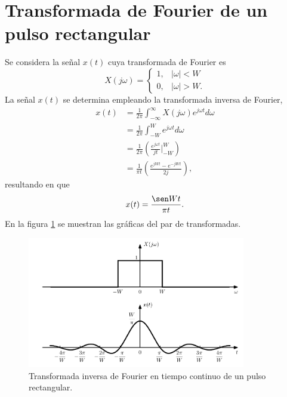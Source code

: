 \documentclass[a4paper]{report}
\begin{document}
\section{Transformada de Fourier de un pulso rectangular}
 
Se considera la señal \(x(t)\) cuya transformada de Fourier es
\[
 X(j\omega)=
 \left\{ 
 \begin{array}{ll}
  1, & |\omega|< W\\
  0, & |\omega|>W.
 \end{array} 
 \right.
\]
La señal \(x(t)\) se determina empleando la transformada inversa de Fourier,
\begin{align*}
 x(t)&=\frac{1}{2\pi}\int_{-\infty}^{\infty}X(j\omega)e^{j\omega t}d\omega\\
  &=\frac{1}{2\pi}\int_{-W}^{W}e^{j\omega t}d\omega\\
  &=\frac{1}{2\pi}\left(\frac{e^{j\omega t}}{jt}\bigg|_{-W}^{W}\right)\\
  &=\frac{1}{\pi t}\left(\frac{e^{jW t}-e^{-jW t}}{2j}\right),
\end{align*}
resultando en que
\begin{equation}\label{eq:continous_inverse_fourier_transform_rectangular_pulse}
  x(t)=\frac{\sen Wt}{\pi t}.
\end{equation}
En la figura \ref{fig:sampling_lowpass_continuous_inverse_fourier_transform_1} se muestran las gráficas del par de transformadas.
\begin{figure}[!htb]
 \begin{center}
 \includegraphics[width=0.85\textwidth]{figuras/sampling_lowpass_continuous_inverse_fourier_transform_1.pdf}
 \caption{\label{fig:sampling_lowpass_continuous_inverse_fourier_transform_1} Transformada inversa de Fourier en tiempo continuo de un pulso rectangular.}
 \end{center}
\end{figure}











\end{document}
